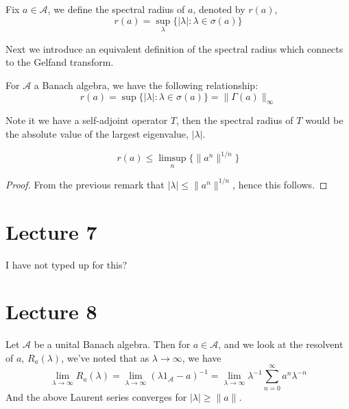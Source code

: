 \begin{definition}
    Fix $a\in\mathcal{A}$, we define the spectral radius of $a$, denoted by $r(a)$,
    \begin{equation*}
        r(a)=\sup_\lambda\{|\lambda|:\lambda\in\sigma(a)\}
    \end{equation*}
\end{definition}
Next we introduce an equivalent definition of the spectral radius which connects to the Gelfand transform.
\begin{proposition}
    For $\mathcal{A}$ a Banach algebra, we have the following relationship:
    \begin{equation*}
        r(a)=\sup\{|\lambda|:\lambda\in\sigma(a)\}=\|\Gamma(a)\|_\infty
    \end{equation*}
\end{proposition}

\begin{example}
    Note it we have a self-adjoint operator $T$, then the spectral radius of $T$ would be the absolute value of the largest eigenvalue, $|\lambda|$.
\end{example}
\begin{corollary}
    \begin{equation*}
        r(a)\leq\limsup_n\{\|a^n\|^{1/n}\}
    \end{equation*}
\end{corollary}
\begin{proof}
From the previous remark that $|\lambda|\leq\|a^n\|^{1/n}$, hence this follows.
\end{proof}


\section{Lecture 7}
I have not typed up for this?


\section{Lecture 8}
Let $\mathcal{A}$ be a unital Banach algebra. Then for $a\in\mathcal{A}$, and we look at the resolvent of $a$, $R_a(\lambda)$, we've noted that as $\lambda\to\infty$, we have
\begin{equation*}
    \lim_{\lambda\to\infty}R_a(\lambda)=\lim_{\lambda\to\infty}(\lambda1_\mathcal{A}-a)^{-1}=\lim_{\lambda\to\infty}\lambda^{-1}\sum_{n=0}^\infty a^n\lambda^{-n}
\end{equation*}
And the above Laurent series converges for $|\lambda|\geq\|a\|$.

